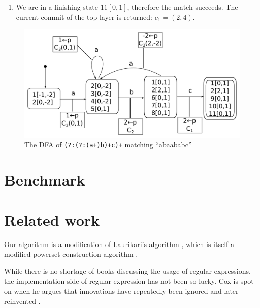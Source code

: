 \documentclass[english]{sigplanconf}
\theoremstyle{definition}
\begin{document}
\begin{enumerate}
\begin{enumerate}
\item We are in a finishing state $11[0,1]$, therefore the match succeeds.
The current commit of the top layer is returned: $c_{1}=(2,4)$.
\end{enumerate}
\end{enumerate}
\begin{figure}
\includegraphics[width=\linewidth]{graphs/abc-dfa}

\caption{\label{fig:lazy-dfa}The DFA of \texttt{(?:(?:(a+)b)+c)+} matching
``abaababc''}


\end{figure}

\section{Benchmark}


\section{Related work}
Our algorithm is a modification of Laurikari's algorithm \cite{laurikari2000nfas},
which is itself a modified powerset construction algorithm \cite[p. 55]{Sipser2005}.

While there is no shortage of books discussing the usage of regular
expressions, the implementation side of regular expression has not
been so lucky. Cox is spot-on when he argues that innovations have
repeatedly been ignored and later reinvented \cite{Cox07a}. 
\end{document}
